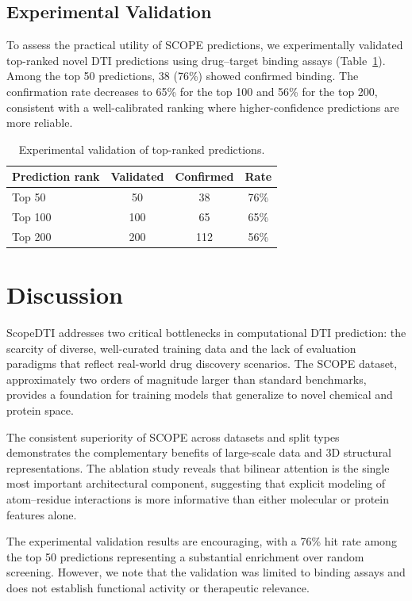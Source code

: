 \documentclass[11pt]{article}
\begin{document}
\subsection{Experimental Validation}

To assess the practical utility of SCOPE predictions, we experimentally validated top-ranked novel DTI predictions using drug--target binding assays (Table~\ref{tab:validation}). Among the top 50 predictions, 38 (76\%) showed confirmed binding. The confirmation rate decreases to 65\% for the top 100 and 56\% for the top 200, consistent with a well-calibrated ranking where higher-confidence predictions are more reliable.

\begin{table}[h]
\centering
\caption{Experimental validation of top-ranked predictions.}
\label{tab:validation}
\begin{tabular}{lccc}
\toprule
Prediction rank & Validated & Confirmed & Rate \\
\midrule
Top 50 & 50 & 38 & 76\% \\
Top 100 & 100 & 65 & 65\% \\
Top 200 & 200 & 112 & 56\% \\
\bottomrule
\end{tabular}
\end{table}

\section{Discussion}

ScopeDTI addresses two critical bottlenecks in computational DTI prediction: the scarcity of diverse, well-curated training data and the lack of evaluation paradigms that reflect real-world drug discovery scenarios. The SCOPE dataset, approximately two orders of magnitude larger than standard benchmarks, provides a foundation for training models that generalize to novel chemical and protein space.

The consistent superiority of SCOPE across datasets and split types demonstrates the complementary benefits of large-scale data and 3D structural representations. The ablation study reveals that bilinear attention is the single most important architectural component, suggesting that explicit modeling of atom--residue interactions is more informative than either molecular or protein features alone.

The experimental validation results are encouraging, with a 76\% hit rate among the top 50 predictions representing a substantial enrichment over random screening. However, we note that the validation was limited to binding assays and does not establish functional activity or therapeutic relevance.
\end{document}
